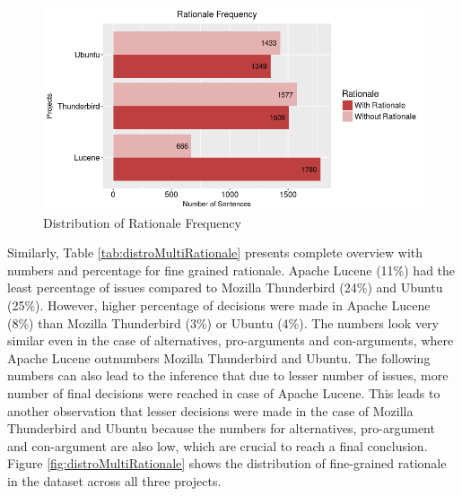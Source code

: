 \documentclass[a4paper,12pt,twoside]{report}
\begin{document}
\begin{figure}[H] %
    \centering
    \includegraphics[width=12cm]{binary-distro-rationale}
    \caption{Distribution of Rationale Frequency}
    \label{fig:distroBinaryRationale}
\end{figure}
\noindent \newline
Similarly, Table \ref{tab:distroMultiRationale} presents complete overview with numbers and percentage for fine grained rationale. Apache Lucene (11\%) had the least percentage of issues compared to Mozilla Thunderbird (24\%) and Ubuntu (25\%). However, higher percentage of decisions were made in Apache Lucene (8\%) than Mozilla Thunderbird (3\%) or Ubuntu (4\%). The numbers look very similar even in the case of alternatives, pro-arguments and con-arguments, where Apache Lucene outnumbers Mozilla Thunderbird and Ubuntu. 
\newline \newline
The following numbers can also lead to the inference that due to lesser number of issues, more number of final decisions were reached in case of Apache Lucene. This leads to another observation that lesser decisions were made in the case of Mozilla Thunderbird and Ubuntu because the numbers for alternatives, pro-argument and con-argument are also low, which are crucial to reach a final conclusion. Figure \ref{fig:distroMultiRationale} shows the distribution of fine-grained rationale in the dataset across all three projects. 
\end{document}
